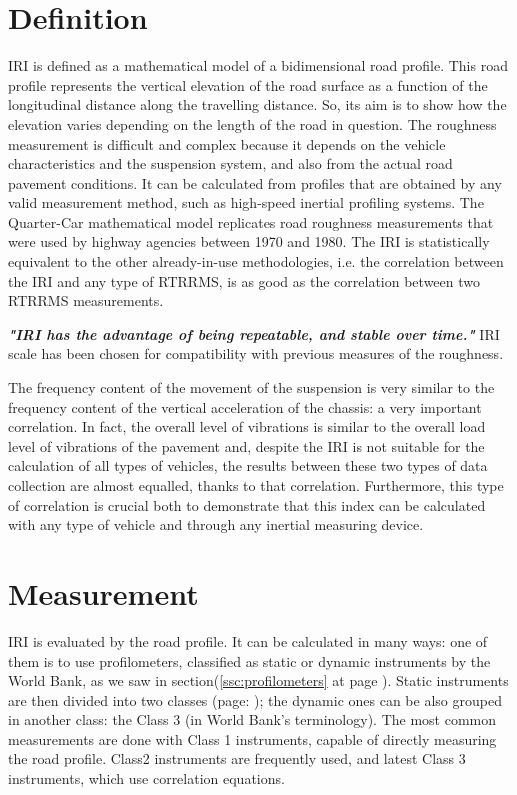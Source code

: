 \documentclass[tesi]{subfiles}
\begin{document}
\section{Definition}\label{sc:IRI Definition}
IRI is defined as a mathematical model of a bidimensional road profile. This road profile represents the vertical elevation of the road surface as a function of the longitudinal distance along the travelling distance\cite{wang2006road}. So, its aim is to show how the elevation varies depending on the length of the road in question.
The roughness measurement is difficult and complex because it depends on the vehicle characteristics and the suspension system, and also from the actual road pavement conditions. It can be calculated from profiles that are obtained by any valid measurement method, such as high-speed inertial profiling systems.
The Quarter-Car mathematical model replicates road roughness measurements that were used by highway agencies between 1970 and 1980. The IRI is statistically equivalent to the other already-in-use methodologies, i.e. the correlation between the IRI and any type of RTRRMS, is as good as the correlation between two RTRRMS measurements.

\textbf{\textit{"IRI has the advantage of being repeatable, and stable over time."}}
IRI scale has been chosen for compatibility with previous measures of the roughness.


The frequency content of the movement of the suspension is very similar to the frequency content of the vertical acceleration of the chassis: a very important correlation. In fact, the overall level of vibrations is similar to the overall load level of vibrations of the pavement and, despite the IRI is not suitable for the calculation of all types of vehicles, the results between these two types of data collection are almost equalled, thanks to that correlation. Furthermore, this type of correlation is crucial both to demonstrate that this index can be calculated with any type of vehicle and through any inertial measuring device.

\section{Measurement}\label{Measurement of IRI}
IRI is evaluated by the road profile. It can be calculated in many ways: one of them is to use profilometers, classified as static or dynamic instruments by the World Bank, as we saw in section(\ref{ssc:profilometers} at page \pageref{ssc:profilometers}). Static instruments are then divided into two classes (page: \pageref{ssc:Instrument_Contact}); the dynamic ones can be also grouped in another class: the Class 3 (in World Bank's terminology).
The most common measurements are done with Class 1 instruments, capable of directly measuring the road profile. Class2 instruments are frequently used, and latest Class 3 instruments, which use correlation equations.
\clearpage
\end{document}
